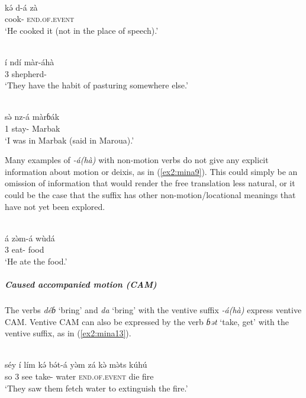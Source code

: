 \ea\label{ex2:mina6}
 \\
\gll  kə́	d-á	zà \\
	cook-	\textsc{end.of.event} \\
\glt `He cooked it (not in the place of speech).'

\ex\label{ex2:mina7}
 \\
\gll í	ndí	màr-áhà		\\
3		shepherd-	 \\
\glt `They have the habit of pasturing somewhere else.'

\ex\label{ex2:mina8}
 \\
\gll sə̀	nz-á	màrɓák	\\
1	stay-	Marbak	 \\
\glt `I was in Marbak (said in Maroua).'
\z 

\largerpage
Many examples of \textit{-á(hà)} with non-motion verbs do not give any explicit information about motion or deixis, as in (\ref{ex2:mina9}). This could simply be an omission of information that would render the free translation less natural, or it could be the case that the suffix has other non-motion/locational meanings that have not yet been explored.

\ea\label{ex2:mina9}
 \\
\gll á zə̀m-á wùdá \\	
3 eat- food	\\
\glt `He ate the food.'
\z

\subparagraph{Caused accompanied motion (CAM)}

The verbs \textit{déɓ} `bring' and \textit{da} `bring' with the ventive suffix \textit{-á(hà)} express ventive CAM. Ventive CAM can also be expressed by the verb \textit{ɓət} `take, get' with the ventive suffix, as in (\ref{ex2:mina13}). 

\ea\label{ex2:mina13}
 \\
\gll séy	í	lím	kə́	bə́t-á	yə̀m	zá	kə̀	mə̀ts	kúhú \\
so	3	see		take-	water	\textsc{end.of.event}		die	fire \\
\glt `They saw them fetch water to extinguish the fire.'
\z 

